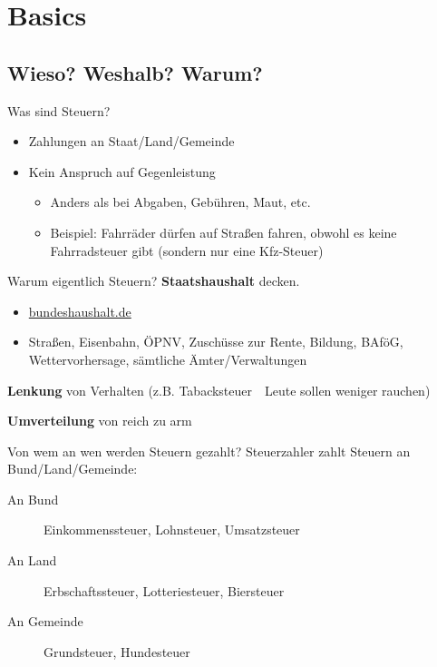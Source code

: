 \documentclass{beamer}
\newcommand{\n}{\hfill\\\vspace{0.25cm}}
\begin{document}
	\begin{frame}
		\tableofcontents[hidesubsections]
	\end{frame}
	
	\section{Basics}
	
		\begin{frame}
		\end{frame}
	
		\subsection{Wieso? Weshalb? Warum?}
	
			\begin{frame}{Was sind Steuern?}
				\begin{itemize}
					\item Zahlungen an Staat/Land/Gemeinde
					\item Kein Anspruch auf Gegenleistung
					\begin{itemize}
						\item Anders als bei Abgaben, Gebühren, Maut, etc.
						\item Beispiel: Fahrräder dürfen auf Straßen fahren, obwohl es keine Fahrradsteuer gibt (sondern nur eine Kfz-Steuer)
					\end{itemize}
				\end{itemize}
			\end{frame}
		
			\begin{frame}{Warum eigentlich Steuern?}
				\textbf{Staatshaushalt} decken.
				\begin{itemize}
					\item \href{https://www.bundeshaushalt.de/DE/Bundeshaushalt-digital/bundeshaushalt-digital.html}{bundeshaushalt.de}
					\item Straßen, Eisenbahn, ÖPNV, Zuschüsse zur Rente, Bildung, BAföG, Wettervorhersage, sämtliche Ämter/Verwaltungen
				\end{itemize}
			
				\textbf{Lenkung} von Verhalten (z.B. Tabacksteuer\ \textrightarrow\ Leute sollen weniger rauchen)
				
				\textbf{Umverteilung} von reich zu arm
			\end{frame}
		
			\begin{frame}{Von wem an wen werden Steuern gezahlt?}
				Steuerzahler zahlt Steuern an Bund/Land/Gemeinde:\n
				
				\begin{description}
					\item[An Bund] Einkommenssteuer, Lohnsteuer, Umsatzsteuer
					\item[An Land] Erbschaftssteuer, Lotteriesteuer, Biersteuer
					\item[An Gemeinde] Grundsteuer, Hundesteuer
				\end{description}
			\end{frame}
		
\end{document}
